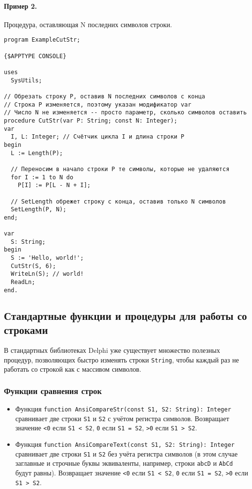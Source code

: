 \documentclass[12pt,a4paper]{report}
\begin{document}
\paragraph*{Пример 2.} Процедура, оставляющая N последних символов строки.
\begin{verbatim}
program ExampleCutStr;

{$APPTYPE CONSOLE}

uses
  SysUtils;

// Обрезать строку P, оставив N последних символов с конца
// Строка P изменяется, поэтому указан модификатор var
// Число N не изменяется -- просто параметр, сколько символов оставить
procedure CutStr(var P: String; const N: Integer);
var
  I, L: Integer; // Счётчик цикла I и длина строки P
begin
  L := Length(P);

  // Переносим в начало строки P те символы, которые не удаляются
  for I := 1 to N do
    P[I] := P[L - N + I];

  // SetLength обрежет строку с конца, оставив только N символов
  SetLength(P, N);
end;

var
  S: String;
begin
  S := 'Hello, world!';
  CutStr(S, 6);
  WriteLn(S); // world!
  ReadLn;
end.
\end{verbatim}

\subsection*{Стандартные функции и процедуры для работы со строками}
В стандартных библиотеках Delphi уже существует множество полезных процедур, позволяющих быстро изменять строки \texttt{String}, чтобы каждый раз не работать со строкой как с массивом символов.
\subsubsection*{Функции сравнения строк}
\begin{itemize}
\item Функция \texttt{function AnsiCompareStr(const S1, S2: String): Integer} сравнивает две строки \texttt{S1} и \texttt{S2} с учётом регистра символов. Возвращает значение \texttt{<0} если \texttt{S1 < S2}, \texttt{0} если \texttt{S1 = S2}, \texttt{>0} если \texttt{S1 > S2}.
\item Функция \texttt{function AnsiCompareText(const S1, S2: String): Integer} сравнивает две строки \texttt{S1} и \texttt{S2} без учёта регистра символов (в этом случае заглавные и строчные буквы эквиваленты, например, строки \texttt{abcD} и \texttt{AbCd} будут равны). Возвращает значение \texttt{<0} если \texttt{S1 < S2}, \texttt{0} если \texttt{S1 = S2}, \texttt{>0} если \texttt{S1 > S2}.
\end{itemize}
\end{document}
